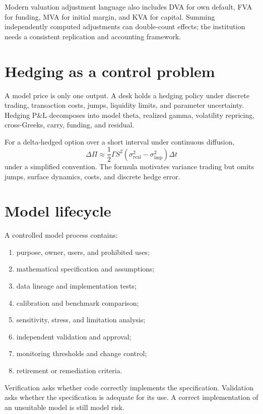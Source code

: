 Modern valuation adjustment language also includes DVA for own default, FVA for
funding, MVA for initial margin, and KVA for capital. Summing independently computed
adjustments can double-count effects; the institution needs a consistent replication
and accounting framework.

\section{Hedging as a control problem}

A model price is only one output. A desk holds a hedging policy under discrete
trading, transaction costs, jumps, liquidity limits, and parameter uncertainty.
Hedging P\&L decomposes into model theta, realized gamma, volatility repricing,
cross-Greeks, carry, funding, and residual.

For a delta-hedged option over a short interval under continuous diffusion,
\[
\Delta\Pi\approx
\frac12\Gamma S^2
(\sigma_{\mathrm{real}}^2-\sigma_{\mathrm{imp}}^2)\Delta t
\]
under a simplified convention. The formula motivates variance trading but omits
jumps, surface dynamics, costs, and discrete hedge error.

\section{Model lifecycle}

A controlled model process contains:

\begin{enumerate}
\item purpose, owner, users, and prohibited uses;
\item mathematical specification and assumptions;
\item data lineage and implementation tests;
\item calibration and benchmark comparison;
\item sensitivity, stress, and limitation analysis;
\item independent validation and approval;
\item monitoring thresholds and change control;
\item retirement or remediation criteria.
\end{enumerate}

Verification asks whether code correctly implements the specification. Validation
asks whether the specification is adequate for its use. A correct implementation of
an unsuitable model is still model risk.

